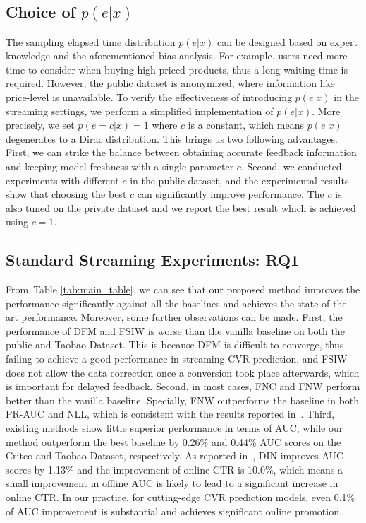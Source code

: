 \documentclass[letterpaper]{article} %
\newcommand{\mtabref}[1]{Table \ref{#1}}
\newcommand{\mdata}{Taobao Dataset}
\begin{document}
\subsection{Choice of $p(e|x)$}
The sampling elapsed time distribution $p(e|x)$ can be designed based on expert knowledge and the aforementioned bias analysis. For example, users need more time to consider when buying high-priced products, thus a long waiting time is required. However, the public dataset is anonymized, where information like price-level is unavailable. To verify the effectiveness of introducing $p(e|x)$ in the streaming settings, we perform a simplified implementation of $p(e|x)$. More precisely, we set $p(e=c|x)=1$ where $c$ is a constant, which means $p(e|x)$ degenerates to a Dirac distribution. This brings us two following advantages. First, we can strike the balance between obtaining accurate feedback information and keeping model freshness with a single parameter $c$. Second, we conducted experiments with different $c$ in the public dataset, and the experimental results show that choosing the best $c$ can significantly improve performance. The $c$ is also tuned on the private dataset and we report the best result which is achieved using $c=1$.

\subsection{Standard Streaming Experiments: RQ1}

From~\mtabref{tab:main_table}, we can see that our proposed method improves the performance significantly against all the baselines and achieves the state-of-the-art performance. Moreover, some further observations can be made. First, the performance of DFM and FSIW is worse than the vanilla baseline on both the public and \mdata{}. This is because DFM is difficult to converge, thus failing to achieve a good performance in streaming CVR prediction, and FSIW does not allow the data correction once a conversion took place afterwards, which is important for delayed feedback. Second, in most cases, FNC and FNW perform better than the vanilla baseline. Specially, FNW outperforms the baseline in both PR-AUC and NLL, which is consistent with the results reported in~\citet{FNW}. Third, existing methods show little superior performance in terms of AUC, while our method outperform the best baseline by 0.26\% and 0.44\% AUC scores on the Criteo and \mdata{}, respectively. As reported in~\citet{zhou2018deep}, DIN improves AUC scores by 1.13\% and the improvement of online CTR is 10.0\%, which means a small improvement in offline AUC is likely to lead to a significant increase in online CTR. In our practice, for cutting-edge CVR prediction models, even 0.1\% of AUC improvement is substantial and achieves significant online promotion.
\end{document}
